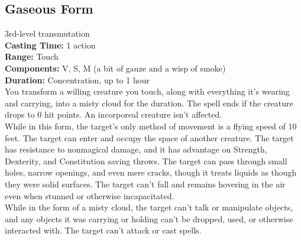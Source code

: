 \documentclass[11pt, A4paper, english]{article}
\begin{document}
		\subsection{Gaseous Form}
3rd-level transmutation \\
\textbf{Casting Time:} 1 action \\
\textbf{Range:} Touch \\
\textbf{Components:} V, S, M (a bit of gauze and a wisp of smoke) \\
\textbf{Duration:} Concentration, up to 1 hour \\
You transform a willing creature you touch, along with everything it’s wearing and carrying, into a misty cloud for the duration. The spell ends if the creature drops to 0 hit points. An incorporeal creature isn’t affected. \\
While in this form, the target’s only method of movement is a flying speed of 10 feet. The target can enter and occupy the space of another creature. The target has resistance to nonmagical damage, and it has advantage on Strength, Dexterity, and Constitution saving throws. The target can pass through small holes, narrow openings, and even mere cracks, though it treats liquids as though they were solid surfaces. The target can't fall and remains hovering in the air even when stunned or otherwise incapacitated. \\
While in the form of a misty cloud, the target can’t talk or manipulate objects, and any objects it was carrying or holding can’t be dropped, used, or otherwise interacted with. The target can’t attack or cast spells.
\end{document}
